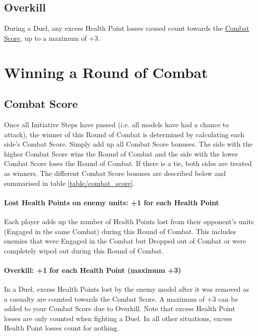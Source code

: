 \subsection{Overkill}
\label{overkill}

During a Duel, any excess Health Point losses caused count towards the \hyperref[combat_score]{Combat Score}, up to a maximum of +3.

\columnbreak

\section{Winning a Round of Combat}
\label{winning_a_round_of_combat}

\subsection{Combat Score}
\label{combat_score}

Once all Initiative Steps have passed (i.e. all models have had a chance to attack), the winner of this Round of Combat is determined by calculating each side's Combat Score. Simply add up all Combat Score bonuses. The side with the higher Combat Score wins the Round of Combat and the side with the lower Combat Score loses the Round of Combat. If there is a tie, both sides are treated as winners. The different Combat Score bonuses are described below and summarised in table \ref{table/combat_score}.

\paragraph{Lost Health Points on enemy units: +1 for each Health Point}

Each player adds up the number of Health Points lost from their opponent's units (Engaged in the same Combat) during this Round of Combat. This includes enemies that were Engaged in the Combat but Dropped out of Combat or were completely wiped out during this Round of Combat.

\paragraph{Overkill: +1 for each Health Point (maximum +3)}

In a Duel, excess Health Points lost by the enemy model after it was removed as a casualty are counted towards the Combat Score. A maximum of +3 can be added to your Combat Score due to Overkill. Note that excess Health Point losses are only counted when fighting a Duel. In all other situations, excess Health Point losses count for nothing.

